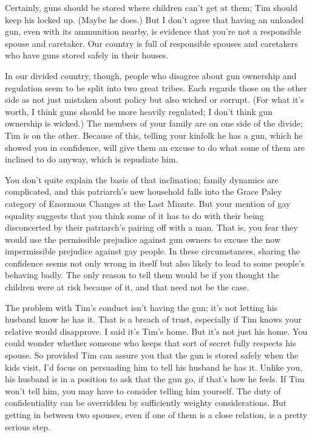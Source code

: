 Certainly, guns should be stored where children can't get at them; Tim
should keep his locked up. (Maybe he does.) But I don't agree that
having an unloaded gun, even with its ammunition nearby, is evidence
that you're not a responsible spouse and caretaker. Our country is full
of responsible spouses and caretakers who have guns stored safely in
their houses.

In our divided country, though, people who disagree about gun ownership
and regulation seem to be split into two great tribes. Each regards
those on the other side as not just mistaken about policy but also
wicked or corrupt. (For what it's worth, I think guns should be more
heavily regulated; I don't think gun ownership is wicked.) The members
of your family are on one side of the divide; Tim is on the other.
Because of this, telling your kinfolk he has a gun, which he showed you
in confidence, will give them an excuse to do what some of them are
inclined to do anyway, which is repudiate him.

You don't quite explain the basis of that inclination; family dynamics
are complicated, and this patriarch's new household falls into the Grace
Paley category of Enormous Changes at the Last Minute. But your mention
of gay equality suggests that you think some of it has to do with their
being disconcerted by their patriarch's pairing off with a man. That is,
you fear they would use the permissible prejudice against gun owners to
excuse the now impermissible prejudice against gay people. In these
circumstances, sharing the confidence seems not only wrong in itself but
also likely to lead to some people's behaving badly. The only reason to
tell them would be if you thought the children were at risk because of
it, and that need not be the case.

The problem with Tim's conduct isn't having the gun; it's not letting
his husband know he has it. That is a breach of trust, especially if Tim
knows your relative would disapprove. I said it's Tim's home. But it's
not just his home. You could wonder whether someone who keeps that sort
of secret fully respects his spouse. So provided Tim can assure you that
the gun is stored safely when the kids visit, I'd focus on persuading
him to tell his husband he has it. Unlike you, his husband is in a
position to ask that the gun go, if that's how he feels. If Tim won't
tell him, you may have to consider telling him yourself. The duty of
confidentiality can be overridden by sufficiently weighty
considerations. But getting in between two spouses, even if one of them
is a close relation, is a pretty serious step.

